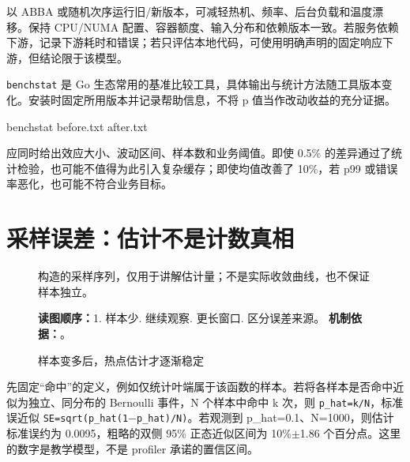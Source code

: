 \documentclass[UTF8,fontset=fandol,openany,11pt]{ctexbook}
\begin{document}
以 ABBA 或随机次序运行旧/新版本，可减轻热机、频率、后台负载和温度漂移。保持 CPU/NUMA 配置、容器额度、输入分布和依赖版本一致。若服务依赖下游，记录下游耗时和错误；若只评估本地代码，可使用明确声明的固定响应下游，但结论限于该模型。

\texttt{benchstat} 是 Go 生态常用的基准比较工具，具体输出与统计方法随工具版本变化。安装时固定所用版本并记录帮助信息，不将 p 值当作改动收益的充分证据。\cite{go-benchstat}

\begin{codeblock}
benchstat before.txt after.txt
\end{codeblock}

应同时给出效应大小、波动区间、样本数和业务阈值。即使 0.5\% 的差异通过了统计检验，也可能不值得为此引入复杂缓存；即使均值改善了 10\%，若 p99 或错误率恶化，也可能不符合业务目标。

\section{采样误差：估计不是计数真相}
\begin{figure}[H]
\centering
{}
\caption{样本变多后，热点估计才逐渐稳定}\label{fig:03-sampling}
\begin{minipage}{0.96\linewidth}\footnotesize 构造的采样序列，仅用于讲解估计量；不是实际收敛曲线，也不保证样本独立。

\textbf{读图顺序：}1. 样本少. 继续观察. 更长窗口. 区分误差来源。
\textbf{机制依据：}\cite{go-pprof}。
\end{minipage}
\end{figure}
先固定“命中”的定义，例如仅统计叶端属于该函数的样本。若将各样本是否命中近似为独立、同分布的 Bernoulli 事件，N 个样本中命中 k 次，则 \texttt{p\_\allowbreak{}hat=k/\allowbreak{}N}，标准误近似 \texttt{SE=sqrt(p\_\allowbreak{}hat(1\ensuremath{-}p\_\allowbreak{}hat)/\allowbreak{}N)}。若观测到 p\_hat=0.1、N=1000，则估计标准误约为 0.0095，粗略的双侧 95\% 正态近似区间为 10\%\ensuremath{\pm}1.86 个百分点。这里的数字是教学模型，不是 profiler 承诺的置信区间。
\end{document}
